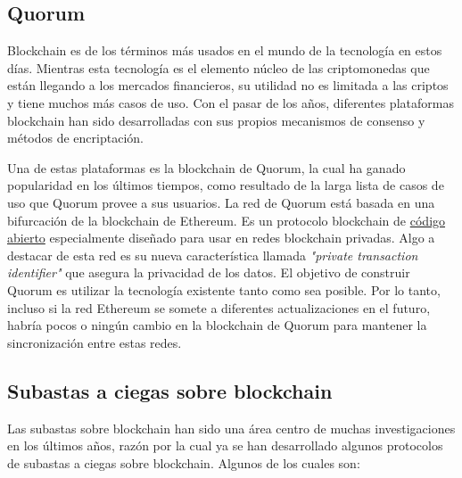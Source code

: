   \subsection{Quorum} \hspace*{}

    Blockchain es de los términos más usados en el mundo de la tecnología en estos días. Mientras esta tecnología es el elemento núcleo 
    de las criptomonedas que están llegando a los mercados financieros, su utilidad no es limitada a las criptos y tiene muchos más casos 
    de uso. Con el pasar de los años, diferentes plataformas blockchain han sido desarrolladas con sus propios mecanismos de consenso y 
    métodos de encriptación.

    Una de estas plataformas es la blockchain de Quorum, la cual ha ganado popularidad en los últimos tiempos, como resultado de la larga
    lista de casos de uso que Quorum provee a sus usuarios. La red de Quorum está basada en una bifurcación de la blockchain de Ethereum.
    Es un protocolo blockchain de \href{https://github.com/ConsenSys/quorum}{código abierto} especialmente diseñado para usar en redes 
    blockchain privadas. Algo a destacar de esta red
    es su nueva característica llamada \textit{"private transaction identifier"}  que asegura la privacidad de los datos. El objetivo de
    construir Quorum es utilizar la tecnología existente tanto como sea posible. Por lo tanto, incluso si la red Ethereum se somete a 
    diferentes actualizaciones en el futuro, habría pocos o ningún cambio en la blockchain de Quorum para mantener la sincronización entre
    estas redes.


  \subsection{Subastas a ciegas sobre blockchain} \hspace*{}
    Las subastas sobre blockchain han sido una área centro de muchas investigaciones en los últimos años, razón por la cual ya se han 
    desarrollado algunos protocolos de subastas a ciegas sobre blockchain. Algunos de los cuales son:

